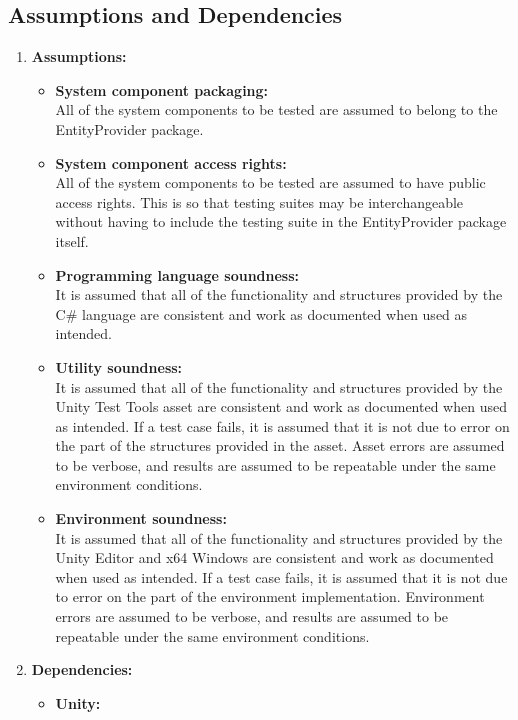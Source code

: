 \documentclass[a4paper,12pt]{article}
\begin{document}
\subsection{Assumptions and Dependencies}
	\begin{enumerate}
		\item \textbf{Assumptions:}
			\begin{itemize}
				\item \textbf{System component packaging:}\\
				All of the system components to be tested are assumed to belong to the EntityProvider package.
				\item \textbf{System component access rights:}\\
				All of the system components to be tested are assumed to have public access rights. This is so that testing suites may be interchangeable without having to include the testing suite in the EntityProvider package itself.
				\item \textbf{Programming language soundness:}\\
				It is assumed that all of the functionality and structures provided by the C\# language are consistent and work as documented when used as intended.
				\item \textbf{Utility soundness:}\\ 
				It is assumed that all of the functionality and structures provided by the Unity Test Tools asset are consistent and work as documented when used as intended. If a test case fails, it is assumed that it is not due to error on the part of the structures provided in the asset. Asset errors are assumed to be verbose, and results are assumed to be repeatable under the same environment conditions.
				\item \textbf{Environment soundness:}\\
				It is assumed that all of the functionality and structures provided by the Unity Editor and x64 Windows are consistent and work as documented when used as intended. If a test case fails, it is assumed that it is not due to error on the part of the environment implementation. Environment errors are assumed to be verbose, and results are assumed to be repeatable under the same environment conditions.
			\end{itemize}	
		\item \textbf{Dependencies:}
			\begin{itemize}
				\item \textbf{Unity:}\\

\end{itemize}
\end{enumerate}
\end{document}
